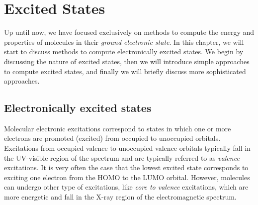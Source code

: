 \documentclass[../Main/notes.tex]{subfiles}
\begin{document}
\chapter{Excited States}

Up until now, we have focused exclusively on methods to compute the energy and properties of molecules in their \emph{ground electronic state}.
In this chapter, we will start to discuss methods to compute electronically excited states.
We begin by discussing the nature of excited states, then we will introduce simple approaches to compute excited states, and finally we will briefly discuss more sophisticated approaches.

\section{Electronically excited states}
Molecular electronic excitations correspond to states in which one or more electrons are promoted (excited) from occupied to unoccupied orbitals.
Excitations from occupied valence to unoccupied valence orbitals typically fall in the UV-visible region of the spectrum and are typically referred to as \emph{valence} excitations.
It is very often the case that the lowest excited state corresponds to exciting one electron from the HOMO to the LUMO orbital.
However, molecules can undergo other type of excitations, like \emph{core to valence} excitations, which are more energetic and fall in the X-ray region of the electromagnetic spectrum.

\end{document}
